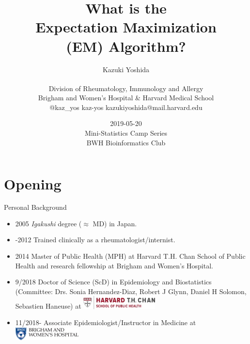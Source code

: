 \documentclass[dvipdfmx,bigger,aspectratio=169]{beamer}
\author{Kazuki Yoshida \\ \\ Division of Rheumatology, Immunology and Allergy \\ Brigham and Women's Hospital \& Harvard Medical School \\ \faTwitter @kaz\_yos \faGithub kaz-yos \faEnvelope kazukiyoshida@mail.harvard.edu}
\date{2019-05-20\\ Mini-Statistics Camp Series \\ BWH Bioinformatics Club \\}
\title{What is the \\ Expectation Maximization \\ (EM) Algorithm? \\}
\begin{document}
\maketitle
\section{Opening}
\label{sec:org91fe8fd}
\begin{frame}[label={sec:orgc420a35},noframenumbering]{Personal Background}
\begin{itemize}
\item 2005 \emph{Igakushi} degree (\(\approx\) MD) in Japan.
\item -2012 Trained clinically as a rheumatologist/internist.
\item 2014 Master of Public Health (MPH) at Harvard T.H. Chan School of Public Health and research fellowship at Brigham and Women's Hospital.
\end{itemize}


\begin{itemize}
\item 9/2018 Doctor of Science (ScD) in Epidemiology and Biostatistics (Committee: Drs. Sonia Hernandez-Diaz, Robert J Glynn, Daniel H Solomon, Sebastien Haneuse) at \includegraphics[height=0.7cm]{./source/HarvardChan_logo_hrz_alt_RGB_Large.png}
\item 11/2018- Associate Epidemiologist/Instructor in Medicine at \includegraphics[height=0.7cm]{./source/bwh.png}
\end{itemize}
\end{frame}
\end{document}
